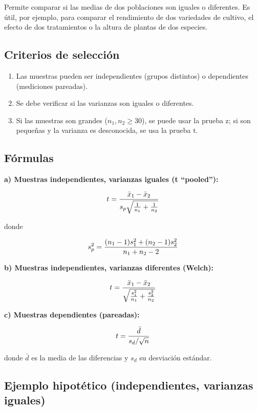 \documentclass[
  spanish,
  letterpaper,
]{book}
\begin{document}
Permite comparar si las medias de dos poblaciones son iguales o
diferentes. Es útil, por ejemplo, para comparar el rendimiento de dos
variedades de cultivo, el efecto de dos tratamientos o la altura de
plantas de dos especies.

\subsection{Criterios de selección}\label{criterios-de-selecciuxf3n-1}

\begin{enumerate}
\def\labelenumi{\arabic{enumi}.}
\item
  Las muestras pueden ser independientes (grupos distintos) o
  dependientes (mediciones pareadas).
\item
  Se debe verificar si las varianzas son iguales o diferentes.
\item
  Si las muestras son grandes (\(n_1, n_2 \geq 30\)), se puede usar la
  prueba z; si son pequeñas y la varianza es desconocida, se usa la
  prueba t.
\end{enumerate}

\subsection{Fórmulas}\label{fuxf3rmulas-1}

\textbf{a) Muestras independientes, varianzas iguales (t ``pooled''):}

\[\huge t = \frac{\bar{x}_1 - \bar{x}_2}{s_p \sqrt{\frac{1}{n_1} + \frac{1}{n_2}}}  \]

donde

\[\huge s_p^2 = \frac{(n_1-1)s_1^2 + (n_2-1)s_2^2}{n_1 + n_2 - 2}  \]

\textbf{b) Muestras independientes, varianzas diferentes (Welch):}

\[\huge t = \frac{\bar{x}_1 - \bar{x}_2}{\sqrt{\frac{s_1^2}{n_1} + \frac{s_2^2}{n_2}}} \]

\textbf{c) Muestras dependientes (pareadas):}

\[\huge t = \frac{\bar{d}}{s_d / \sqrt{n}}\] \hspace{0pt}

donde \(\bar{d}\) es la media de las diferencias y \(s_d\)\hspace{0pt}
su desviación estándar.

\subsection{Ejemplo hipotético (independientes, varianzas
iguales)}\label{ejemplo-hipotuxe9tico-independientes-varianzas-iguales}
\end{document}

